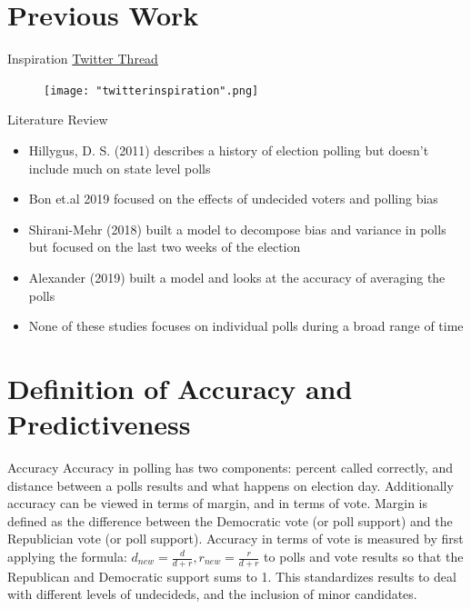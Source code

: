 \documentclass{beamer}\usepackage[]{graphicx}\usepackage[]{color}
\begin{document}
\section{Previous Work}
\begin{frame}{Inspiration}
\href{https://twitter.com/aedwardslevy/status/1138832357224525829}{Twitter Thread}
\begin{figure}[h]
       \centering
        \texttt{[image: "twitterinspiration".png]}
    \end{figure}
\end{frame}

\begin{frame}{Literature Review}
\begin{itemize}
\item Hillygus, D. S. (2011) describes a history of election polling but doesn't include much on state level polls
\item Bon et.al 2019 focused on the effects of undecided voters and polling bias
\item Shirani-Mehr (2018) built a model to decompose bias and variance in polls but focused on the last two weeks of the election
\item Alexander (2019) built a model and looks at the accuracy of averaging the polls
\item None of these studies focuses on individual polls during a broad range of time
\end{itemize}
\end{frame}

\section{Definition of Accuracy and Predictiveness}
\begin{frame}{Accuracy}
Accuracy in polling has two components: percent called correctly, and distance between a polls results and what happens on election day.  Additionally accuracy can be viewed in terms of margin, and in terms of vote. Margin is defined as the difference between the Democratic vote (or poll support) and the Republician vote (or poll support). Accuracy in terms of vote is measured by first applying the formula: $d_{new} = \frac{d}{d+r}, r_{new} = \frac{r}{d+r}$ to polls and vote results so that the Republican and Democratic support sums to 1. This standardizes results to deal with different levels of undecideds, and the inclusion of minor candidates.
\end{frame}
\end{document}
